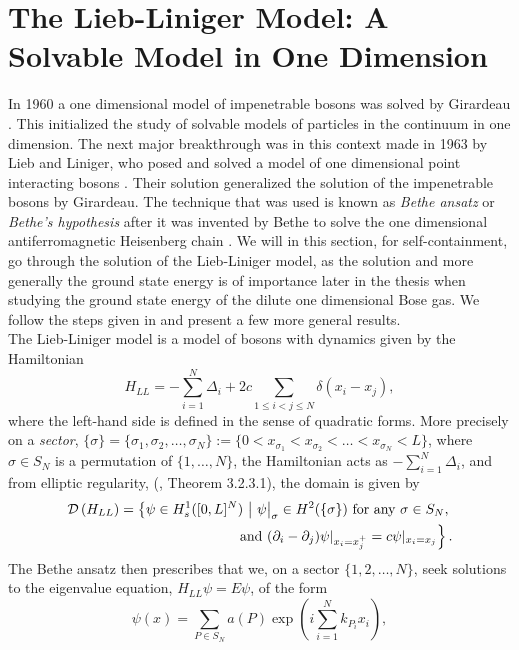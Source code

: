 \section{The Lieb-Liniger Model: A Solvable Model in One Dimension} \label{SectionLiebLinigerModel}
In 1960 a one dimensional model of impenetrable bosons was solved by Girardeau \cite{girardeau1960relationship}. This initialized the study of solvable models of particles in the continuum in one dimension. The next major breakthrough was in this context made in 1963 by Lieb and Liniger, who posed and solved a model of one dimensional point interacting bosons \cite{lieb1963exact}. Their solution generalized the solution of the impenetrable bosons by Girardeau. The technique that was used is known as \emph{Bethe ansatz} or \emph{Bethe's hypothesis} after it was invented by Bethe to solve the one dimensional antiferromagnetic Heisenberg chain \cite{bethe1931theorie}. We will in this section, for self-containment, go through the solution of the Lieb-Liniger model, as the solution and more generally the ground state energy is of importance later in the thesis when studying the ground state energy of the dilute one dimensional Bose gas. We follow the steps given in \cite{lieb1963exact} and present a few more general results.\\
The Lieb-Liniger model is a model of bosons with dynamics given by the Hamiltonian \begin{equation}
H_{LL}=-\sum_{i=1}^{N}\Delta_i+2c \sum_{1\leq i<j\leq N}\delta(x_i-x_j),
\end{equation}
where the left-hand side is defined in the sense of quadratic forms. More precisely on a \emph{sector}, $\{\sigma\}=\{\sigma_1,\sigma_2,\ldots,\sigma_N\}:=\{0< x_{\sigma_1}< x_{\sigma_2} < \ldots < x_{\sigma_N}< L\} $, where $ \sigma\in S_N $ is a permutation of $ \{1,\ldots,N\} $, the Hamiltonian acts as $ -\sum_{i=1}^{N}\Delta_i $, and from elliptic regularity, (\cite{grisvard2011elliptic}, Theorem 3.2.3.1), the domain is given by \begin{equation*}
	\begin{aligned}
	\dom{H_{LL}}=\left\{\psi\in H_s^1([0,L]^N)\ \middle\vert\ \psi\big\rvert_{\sigma}\in H^2(\{\sigma\})\text{ for any }\sigma\in S_{N},\right.\\ \left. \text{ and } (\partial_i-\partial_j)\psi\rvert_{x_i=x_j^+}=c\psi\rvert_{x_i=x_j}\right\}.
	\end{aligned}
\end{equation*}
The Bethe ansatz then prescribes that we, on a sector $ \{1,2,\ldots,N\} $, seek solutions to the eigenvalue equation, $ H_{LL}\psi=E\psi $, of the form\begin{equation}\label{EqBetheAnsatz}
\psi(x)=\sum_{P\in S_N} a(P)\exp\left(i\sum_{i=1}^{N}k_{P_i}x_i\right),
\end{equation}
